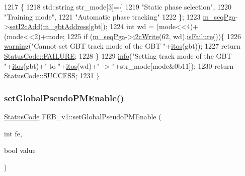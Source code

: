 \begin{DoxyCode}
1217                                                    \{
1218   std::string str\_mode[3]=\{
1219     \textcolor{stringliteral}{"Static phase selection"},
1220     \textcolor{stringliteral}{"Training mode"},
1221     \textcolor{stringliteral}{"Automatic phase tracking"}
1222   \};
1223   \hyperlink{classFEB__v1_a6c7804ac86796f233a8393043adf2e77}{m\_seqPga}->\hyperlink{classSeqPGA_a4ef334e4d2cb417b49033dce951728cd}{setI2cAdd}(\hyperlink{classFEB__v1_ac625855df976f16694178f1a4c0eef1e}{m\_gbtAddress}[gbt]);
1224   \textcolor{keywordtype}{int} wd = (mode<<4)+(mode<<2)+mode;
1225   \textcolor{keywordflow}{if} (\hyperlink{classFEB__v1_a6c7804ac86796f233a8393043adf2e77}{m\_seqPga}->\hyperlink{classSeqPGA_a429076ca3a4ece94182bd95c623bb9d0}{i2cWrite}(62, wd).\hyperlink{classStatusCode_a5dd22dc6eb2c52fc4cabc58f6dea2eb7}{isFailure}())\{
1226     \hyperlink{classObject_a65cd4fda577711660821fd2cd5a3b4c9}{warning}(\textcolor{stringliteral}{"Cannot set GBT track mode of the GBT "}+\hyperlink{Tools_8h_af330027dbdafb9a30768b3613c553e60}{itos}(gbt));
1227     \textcolor{keywordflow}{return} \hyperlink{classStatusCode_a6f565cbeadc76d14c72f047e5e85eb4ba3da73d4c469762eb9d3c960368252b26}{StatusCode::FAILURE};
1228   \}
1229   \hyperlink{classObject_a644fd329ea4cb85f54fa6846484b84a8}{info}(\textcolor{stringliteral}{"Setting track mode of the GBT "}+\hyperlink{Tools_8h_af330027dbdafb9a30768b3613c553e60}{itos}(gbt)+\textcolor{stringliteral}{" to "}+\hyperlink{Tools_8h_af330027dbdafb9a30768b3613c553e60}{itos}(wd)+\textcolor{stringliteral}{" -> "}+str\_mode[mode&0b11]);
1230   \textcolor{keywordflow}{return} \hyperlink{classStatusCode_a6f565cbeadc76d14c72f047e5e85eb4badd0da38d3ba0d922efd1f4619bc37ad8}{StatusCode::SUCCESS};
1231 \}
\end{DoxyCode}
\mbox{\label{classFEB__v1_adce2d9c70235f4226ab59aea3dc5953c}} 
\subsubsection{\texorpdfstring{set\+Global\+Pseudo\+P\+M\+Enable()}{setGlobalPseudoPMEnable()}}
{\footnotesize\ttfamily \hyperlink{classStatusCode}{Status\+Code} F\+E\+B\+\_\+v1\+::set\+Global\+Pseudo\+P\+M\+Enable (\begin{DoxyParamCaption}\item[{int}]{fe,  }\item[{bool}]{value }\end{DoxyParamCaption})}



